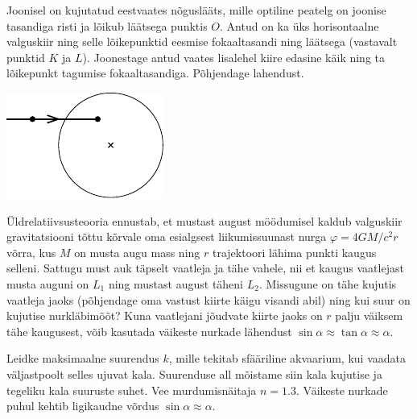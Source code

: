 \documentclass[10pt, twoside]{article}
\begin{document}
{%

Joonisel on kujutatud eestvaates nõguslääts, mille optiline peatelg on joonise tasandiga risti ja lõikub läätsega punktis $O$. Antud on ka üks horisontaalne valguskiir ning selle lõikepunktid eesmise fokaaltasandi ning läätsega (vastavalt punktid $K$ ja $L$). Joonestage antud vaates lisalehel kiire edasine käik ning ta lõikepunkt tagumise fokaaltasandiga. Põhjendage lahendust.
\begin{center}
	\includegraphics[width=0.5\linewidth]{2011-v2g-10-yl}
\end{center}
\probend
\bigskip


Üldrelatiivsusteooria ennustab, et mustast august möödumisel kaldub valguskiir gravitatsiooni tõttu kõrvale oma esialgsest liikumissuunast nurga $\varphi = 4GM/c^2r$ võrra, kus $M$ on musta augu mass ning $r$ trajektoori lähima punkti kaugus selleni. Sattugu must auk täpselt vaatleja ja tähe vahele, nii et kaugus vaatlejast musta auguni on $L_1$ ning mustast august täheni $L_2$. Missugune on tähe kujutis vaatleja jaoks (põhjendage oma vastust kiirte käigu visandi abil) ning kui suur on kujutise nurkläbimõõt? Kuna vaatlejani jõudvate kiirte jaoks on $r$ palju väiksem tähe kaugusest, võib kasutada väikeste nurkade lähendust $\sin \alpha \approx \tan \alpha \approx \alpha$.
\probend
\bigskip


Leidke maksimaalne suurendus $k$, mille tekitab sfääriline akvaarium, kui vaadata väljastpoolt selles ujuvat kala. Suurenduse all mõistame siin kala kujutise ja tegeliku kala suuruste suhet. Vee murdumisnäitaja $n = \num{1,3}$. Väikeste nurkade puhul kehtib ligikaudne võrdus $\sin \alpha \approx \alpha$.
\probend
\bigskip

}
\end{document}
